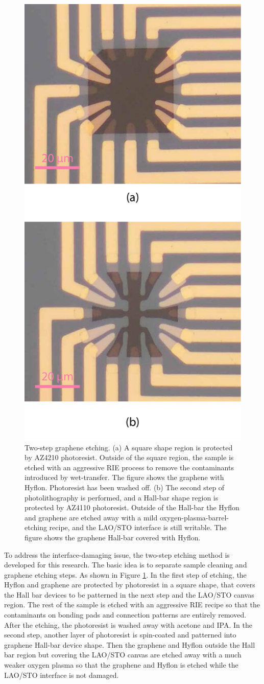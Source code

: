 \documentclass[pdflatex, sectionletters, 12pt]{pittetd}    %
\begin{document}
\begin{figure}[p]
	\centering
	\includegraphics[width=.5\textwidth]{Drawing/RIETwoStep.pdf}
	\caption{Two-step graphene etching. (a) A square shape region is protected by AZ4210 photoresist. Outside of the square region, the sample is etched with an aggressive RIE process to remove the contaminants introduced by wet-transfer. The figure shows the graphene with Hyflon. Photoresist has been washed off. (b) The second step of photolithography is performed, and a Hall-bar shape region is protected by AZ4110 photoresist. Outside of the Hall-bar the Hyflon and graphene are etched away with a mild oxygen-plasma-barrel-etching recipe, and the LAO/STO interface is still writable. The figure shows the graphene Hall-bar covered with Hyflon. }
	\label{FIG:RIETwoStep}
\end{figure}

To address the interface-damaging issue, the two-step etching method is developed for this research. The basic idea is to separate sample cleaning and graphene etching steps. As shown in Figure \ref{FIG:RIETwoStep}. In the first step of etching, the Hyflon and graphene are protected by photoresist in a square shape, that covers the Hall bar devices to be patterned in the next step and the LAO/STO canvas region. The rest of the sample is etched with an aggressive RIE recipe so that the contaminants on bonding pads and connection patterns are entirely removed. After the etching, the photoresist is washed away with acetone and IPA. In the second step, another layer of photoresist is spin-coated and patterned into graphene Hall-bar device shape. Then the graphene and Hyflon outside the Hall bar region but covering the LAO/STO canvas are etched away with a much weaker oxygen plasma so that the graphene and Hyflon is etched while the LAO/STO interface is not damaged.
\end{document}
